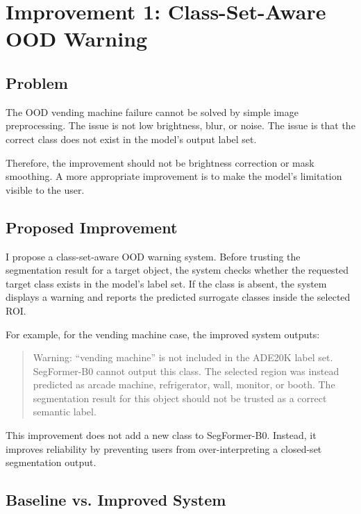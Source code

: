 \documentclass[10pt,a4paper]{article}
\begin{document}
\FloatBarrier

\section{Improvement 1: Class-Set-Aware OOD Warning}

\subsection{Problem}

The OOD vending machine failure cannot be solved by simple image preprocessing.
The issue is not low brightness, blur, or noise.
The issue is that the correct class does not exist in the model's output label set.

Therefore, the improvement should not be brightness correction or mask smoothing.
A more appropriate improvement is to make the model's limitation visible to the user.

\subsection{Proposed Improvement}

I propose a class-set-aware OOD warning system.
Before trusting the segmentation result for a target object, the system checks whether the requested target class exists in the model's label set.
If the class is absent, the system displays a warning and reports the predicted surrogate classes inside the selected ROI.

For example, for the vending machine case, the improved system outputs:

\begin{quote}
Warning: ``vending machine'' is not included in the ADE20K label set.
SegFormer-B0 cannot output this class.
The selected region was instead predicted as arcade machine, refrigerator, wall, monitor, or booth.
The segmentation result for this object should not be trusted as a correct semantic label.
\end{quote}

This improvement does not add a new class to SegFormer-B0.
Instead, it improves reliability by preventing users from over-interpreting a closed-set segmentation output.

\subsection{Baseline vs. Improved System}
\end{document}
